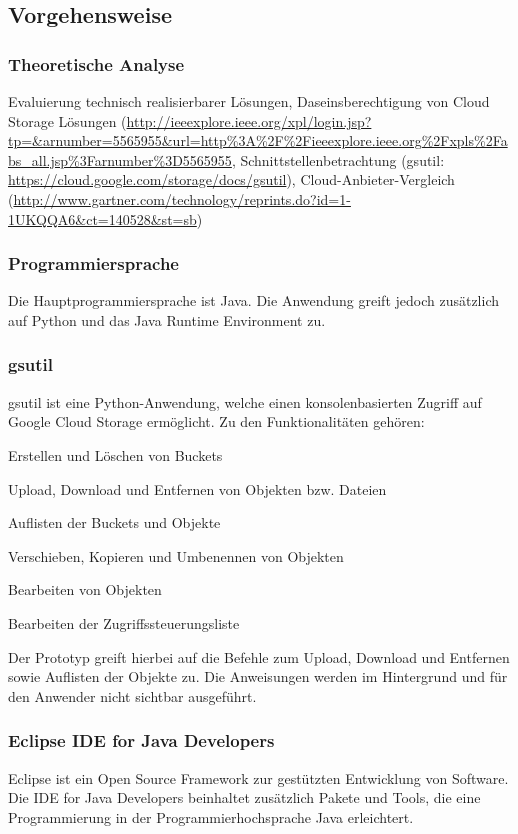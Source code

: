 \documentclass[12pt,a4paper,bibliography=totocnumbered,listof=totocnumbered]{scrartcl}
\begin{document}
\subsection{Vorgehensweise}

\subsubsection{Theoretische Analyse}
Evaluierung technisch realisierbarer Lösungen, Daseinsberechtigung von Cloud Storage Lösungen (\url{http://ieeexplore.ieee.org/xpl/login.jsp?tp=&arnumber=5565955&url=http%3A%2F%2Fieeexplore.ieee.org%2Fxpls%2Fabs_all.jsp%3Farnumber%3D5565955}, Schnittstellenbetrachtung (gsutil:  \url{https://cloud.google.com/storage/docs/gsutil}), Cloud-Anbieter-Vergleich (\url{http://www.gartner.com/technology/reprints.do?id=1-1UKQQA6&ct=140528&st=sb})

\subsubsection{Programmiersprache}
Die Hauptprogrammiersprache ist Java. Die Anwendung greift jedoch zusätzlich auf Python und das Java Runtime Environment zu.
\subsubsection{gsutil}
gsutil ist eine Python-Anwendung, welche einen konsolenbasierten Zugriff auf Google Cloud Storage ermöglicht. Zu den Funktionalitäten gehören:
\begin{compactitem}
	\item Erstellen und Löschen von Buckets
	\item Upload, Download und Entfernen von Objekten bzw. Dateien
	\item Auflisten der Buckets und Objekte
	\item Verschieben, Kopieren und Umbenennen von Objekten
	\item Bearbeiten von Objekten
	\item Bearbeiten der Zugriffssteuerungsliste
\end{compactitem}

Der Prototyp greift hierbei auf die Befehle zum Upload, Download und Entfernen sowie Auflisten der Objekte zu. Die Anweisungen werden im Hintergrund und für den Anwender nicht sichtbar ausgeführt.

\subsubsection{Eclipse IDE for Java Developers}
Eclipse ist ein Open Source Framework zur gestützten Entwicklung von Software. Die IDE for Java Developers beinhaltet zusätzlich Pakete und Tools, die eine Programmierung in der Programmierhochsprache Java erleichtert.
\end{document}
